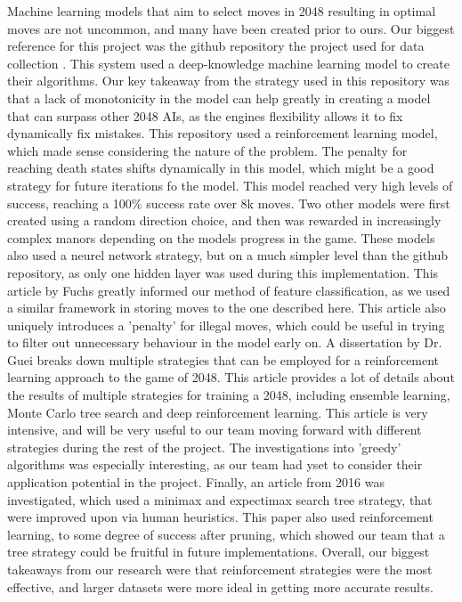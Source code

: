 \documentclass[11pt]{article}
\begin{document}
Machine learning models that aim to select moves in 2048 resulting in optimal moves are not uncommon, and many have been created prior to ours. Our biggest reference for this project was the github repository the project used for data collection \citep{game-difficulty_Narwhal_Sitiyou_2024}. This system used a deep-knowledge machine learning model to create their algorithms. Our key takeaway from the strategy used in this repository was that a lack of monotonicity in the model can help greatly in creating a model that can surpass other 2048 AIs, as the engines flexibility allows it to fix dynamically fix mistakes. This repository used a reinforcement learning model, which made sense considering the nature of the problem. The penalty for reaching death states shifts dynamically in this model, which might be a good strategy for future iterations fo the model. This model reached very high levels of success, reaching a 100\% success rate over 8k moves. Two other models \citep{Chan_2022} \citep{Fuchs} were first created using a random direction choice, and then was rewarded in increasingly complex manors depending on the models progress in the game. These models also used a neurel network strategy, but on a much simpler level than the github repository, as only one hidden layer was used during this implementation. This article by Fuchs greatly informed our method of feature classification, as we used a similar framework in storing moves to the one described here. This article also uniquely introduces a 'penalty' for illegal moves, which could be useful in trying to filter out unnecessary behaviour in the model early on. A dissertation by Dr. Guei \citep{Guei_2023} breaks down multiple strategies that can be employed for a reinforcement learning approach to the game of 2048. This article provides a lot of details about the results of multiple strategies for training a 2048, including ensemble learning, Monte Carlo tree search and deep reinforcement learning. This article is very intensive, and will be very useful to our team moving forward with different strategies during the rest of the project. The investigations into 'greedy' algorithms was especially interesting, as our team had yset to consider their application potential in the project. Finally, an article from 2016 \citep{Yun_Nie_Wenqi_Hou_Yicheng_2016} was investigated, which used a minimax and expectimax search tree strategy, that were improved upon via human heuristics. This paper also used reinforcement learning, to some degree of success after pruning, which showed our team that a tree strategy could be fruitful in future implementations. Overall, our biggest takeaways from our research were that reinforcement strategies were the most effective, and larger datasets were more ideal in getting more accurate results.
\end{document}

